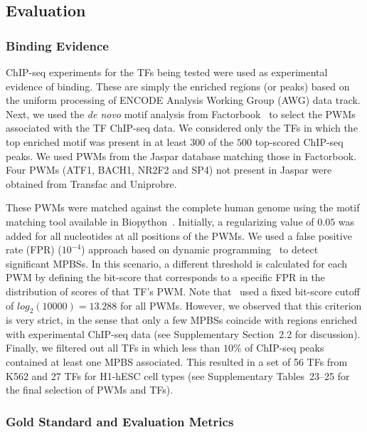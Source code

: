 \documentclass{bioinfo}
\begin{document}
\begin{methods}
\subsection{Evaluation}
\label{sec:evaluation}

\subsubsection{Binding Evidence}
\label{sec:sequence.evidence}

ChIP-seq experiments for the TFs being tested were used as experimental evidence of binding.
These are simply the enriched regions (or peaks) based on the uniform processing of ENCODE
Analysis Working Group (AWG) data track. Next, we used the \emph{de novo} motif analysis
from Factorbook~\citep{wang2013} to select the PWMs associated with the TF ChIP-seq data.
We considered only the TFs in which the top enriched motif was present in at least $300$ of
the $500$ top-scored ChIP-seq peaks. We used PWMs from the Jaspar database matching those
in Factorbook. Four PWMs (ATF1, BACH1, NR2F2 and SP4) not present in Jaspar were obtained
from Transfac and Uniprobre.

These PWMs were matched against the complete human genome using the motif matching tool
available in Biopython~\citep{cock2009}. Initially, a regularizing value of $ 0.05 $ was
added for all nucleotides at all positions of the PWMs. We used a false positive rate (FPR)
($10^{-4}$) approach based on dynamic programming~\citep{wilczynski2009} to detect significant
MPBSs. In this scenario, a different threshold is calculated for each PWM by defining the
bit-score that corresponds to a specific FPR in the distribution of scores of that TF's PWM. Note
that~\cite{pique2011} used a fixed bit-score cutoff of $ log_2(10000) = 13.288 $ for all PWMs.
However, we observed that this criterion is very strict, in the sense that only a few MPBSs
coincide with regions enriched with experimental ChIP-seq data (see Supplementary Section~2.2
for discussion). Finally, we filtered out all TFs in which less than $10\%$ of ChIP-seq peaks
contained at least one MPBS associated. This resulted in a set of 56 TFs from K562 and 27 TFs
for H1-hESC cell types (see Supplementary {\color{red} Tables~23--25} for the final selection of PWMs and TFs).

\subsubsection{Gold Standard and Evaluation Metrics}
\label{sec:gold.standard}


\end{methods}
\end{document}
